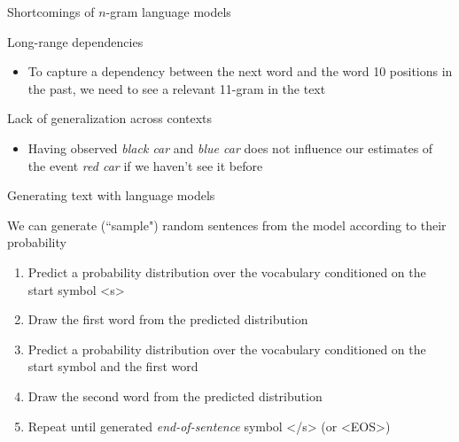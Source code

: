 \documentclass[12pt,aspectratio=169,handout]{beamer}
\begin{document}
\begin{frame}{Shortcomings of $n$-gram language models}
	
	\pause
	Long-range dependencies
	\begin{itemize}
		\item To capture a dependency between the next word and the word 10 positions in the past, we need to see a relevant 11-gram in the text
	\end{itemize}
	
	\pause
	Lack of generalization across contexts
	\begin{itemize}
		\item Having observed \emph{black car} and \emph{blue car} does not influence our estimates of the event \emph{red car} if we haven't see it before
	\end{itemize}
	


\end{frame}


\begin{frame}{Generating text with language models}
	
	We can generate (``sample") random sentences from the model according to their probability
	
	\begin{enumerate}
		\item Predict a probability distribution over the vocabulary conditioned on the start symbol <s>
		\item Draw the first word from the predicted distribution
		\item Predict a probability distribution over the vocabulary conditioned on the start symbol and the first word
		\item Draw the second word from the predicted distribution
		\item Repeat until generated \emph{end-of-sentence} symbol </s> (or <EOS>)
	\end{enumerate}
	
	
\end{frame}
\end{document}

